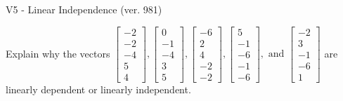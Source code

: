 \begin{exercise}
  \begin{exerciseTitle}V5 - Linear Independence (ver. 981)\end{exerciseTitle}
  \begin{exerciseStatement}
    Explain why the vectors \(\left[\begin{array}{r}
-2 \\
-2 \\
-4 \\
5 \\
4
\end{array}\right] , \left[\begin{array}{r}
0 \\
-1 \\
-4 \\
3 \\
5
\end{array}\right] , \left[\begin{array}{r}
-6 \\
2 \\
4 \\
-2 \\
-2
\end{array}\right] , \left[\begin{array}{r}
5 \\
-1 \\
-6 \\
-1 \\
-6
\end{array}\right] , \text{ and } \left[\begin{array}{r}
-2 \\
3 \\
-1 \\
-6 \\
1
\end{array}\right]\) are linearly dependent or linearly independent.	



\end{exerciseStatement}
\end{exercise}
